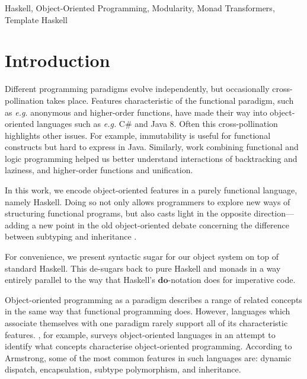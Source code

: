 \documentclass[authoryear,preprint]{sigplanconf}
\begin{document}


\keywords
Haskell, Object-Oriented Programming, Modularity, Monad Transformers, Template Haskell

\section{Introduction}
\label{sec:introduction}

Different programming paradigms evolve independently, but occasionally cross-pollination takes place. Features characteristic of the functional paradigm, such as \emph{e.g.} anonymous and higher-order functions, have made their way into object-oriented languages such as \emph{e.g.} C\# and Java 8. Often this cross-pollination highlights other issues. For example, immutability is useful for functional constructs but hard to express in Java. Similarly, work combining functional and logic programming \citep{nadathur1988overview,hanus2006curry,somogyi1996execution} helped us better understand interactions of backtracking and laziness, and higher-order functions and unification.

In this work, we encode object-oriented features in a purely functional language, namely Haskell. Doing so not only allows programmers to explore new ways of structuring functional programs, but also casts light in the opposite direction---adding a new point in the old object-oriented debate concerning the difference between subtyping and inheritance \cite{cook1989inheritance}. 

For convenience, we present syntactic sugar for our object system on top of standard Haskell. This de-sugars back to pure Haskell and monads in a way entirely
parallel to the way that Haskell's $\mathbf{do}$-notation does for imperative code.

Object-oriented programming as a paradigm describes a range of related concepts in the same way that functional programming does. However, languages which associate themselves with one paradigm rarely support all of its characteristic features. \citet{armstrong2006quarks}, for example, surveys object-oriented languages in an attempt to identify what concepts characterise object-oriented programming. According to Armstrong, some of the most common features in such languages are: dynamic dispatch, encapsulation, subtype polymorphism, and inheritance. 
\end{document}
